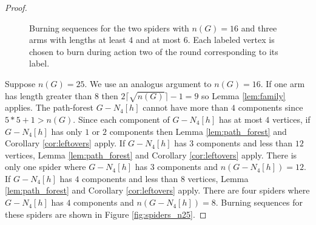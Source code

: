 \documentclass[12pt]{article}
\begin{document}
\begin{proof}
\begin{figure}
\begin{tiny}
        \end{tiny}
        \caption{
            Burning sequences for the two spiders with $n(G) = 16$ and three arms with lengths at least $4$ and at most $6$.
            Each labeled vertex is chosen to burn during action two of the round corresponding to its label.
            }
        \label{fig:spiders_n16}
    \end{figure}

    Suppose $n(G) = 25$.
    We use an analogus argument to $n(G) = 16$.
    If one arm has length greater than $8$ then $2 \lceil \sqrt{n(G)} \rceil - 1 = 9$ so Lemma \ref{lem:family} applies.
    The path-forest $G - N_4[h]$ cannot have more than $4$ components since $5*5 + 1 > n(G)$.
    Since each component of $G-N_4[h]$ has at most $4$ vertices, if $G-N_4[h]$ has only $1$ or $2$ components then Lemma \ref{lem:path_forest} and Corollary \ref{cor:leftovers} apply.
    If $G-N_4[h]$ has $3$ components and less than $12$ vertices, Lemma \ref{lem:path_forest} and Corollary \ref{cor:leftovers} apply.
    There is only one spider where $G-N_4[h]$ has $3$ components and $n(G-N_4[h]) = 12$.
    If $G-N_4[h]$ has $4$ components and less than $8$ vertices, Lemma \ref{lem:path_forest} and Corollary \ref{cor:leftovers} apply.
    There are four spiders where $G-N_4[h]$ has $4$ components and $n(G-N_4[h]) = 8$.
    Burning sequences for these spiders are shown in Figure \ref{fig:spiders_n25}.
    

\end{proof}
\end{document}
